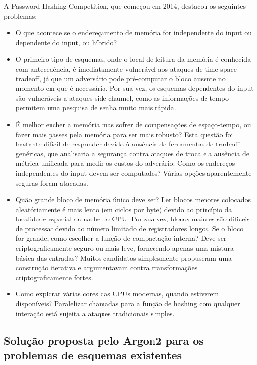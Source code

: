 \documentclass[conference]{IEEEtran}
\begin{document}
A Password Hashing Competition, que começou em 2014, destacou os seguintes problemas: 
\begin{itemize}
\item O que acontece se o endereçamento de memória for independente do input ou 
dependente do input, ou híbrido? 
\item O primeiro tipo de esquemas, onde o local de leitura da memória é conhecida 
com antecedência, é imediatamente vulnerável aos ataques de time-space tradeoff, 
já que um adversário pode pré-computar o bloco ausente no momento em que é necessário. 
Por sua vez, os esquemas dependentes do input são vulneráveis a ataques side-channel, 
como as informações de tempo permitem uma pesquisa de senha muito mais rápida. 
\item É melhor encher a memória mas sofrer de compensações de espaço-tempo, ou fazer 
mais passes pela memória para ser mais robusto? Esta questão foi bastante difícil 
de responder devido à ausência de ferramentas de tradeoff genéricas, 
que analisaria a segurança contra ataques de troca e a ausência de métrica 
unificada para medir os custos do adverário. Como os endereços independentes do 
input devem ser computados? Várias opções aparentemente seguras foram atacadas.
\item Quão grande bloco de memória único deve ser? Ler blocos menores colocados 
aleatóriamente é mais lento (em ciclos por byte) devido ao princípio da 
localidade espacial do cache do CPU. Por sua vez, blocos maiores são dificeis 
de processar devido ao número limitado de registradores longos. Se o bloco 
for grande, como escolher a função de compactação interna? Deve ser criptograficamente 
seguro ou mais leve, fornecendo apenas uma mistura básica das entradas? 
Muitos candidatos simplesmente propuseram uma construção iterativa e argumentavam 
contra transformações criptograficamente fortes. 
\item Como explorar várias cores das CPUs modernas, quando estiverem disponíveis? 
Paralelizar chamadas para a função de hashing com qualquer interação está sujeita 
a ataques tradicionais simples.
\end{itemize} \cite{argon2spec}

\subsection{Solução proposta pelo Argon2 para os problemas de esquemas existentes}
\end{document}
